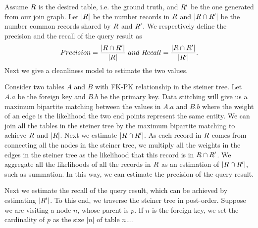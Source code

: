 

Assume $R$ is the desired table, i.e.  the ground truth, and $R'$ be the one
generated from our join graph. Let $|R|$ be the number records in $R$ and
$|R\cap R'|$ be the number common records shared by $R$ and $R'$. We
respectively define the precision and the recall of the query result as
$$Precision=\frac{|R\cap R'|}{|R|}~and~Recall=\frac{|R\cap R'|}{|R'|}.$$
Next we give a cleanliness model to estimate the two values.

Consider two tables $A$ and $B$ with FK-PK relationship in the steiner tree. Let
$A.a$ be the foreign key and $B.b$ be the primary key. Data stitching will give
us a maximum bipartite matching between the values in $A.a$ and $B.b$ where the
weight of an edge is the likelihood the two end points represent the same
entity. We can join all the tables in the steiner tree by the maximum bipartite
matching to achieve $R$ and $|R|$. Next we estimate $|R\cap R'|$. As each
record in $R$ comes from connecting all the nodes in the steiner tree, we
multiply all the weights in the edges in the steiner tree as the likelihood that
this record is in $R\cap R'$. We aggregate all the likelihoods of all the
records in $R$ as an estimation of $|R\cap R'|$, such as summation. In this
way, we can estimate the precision of the query result.


Next we estimate the recall of the query result, which can be achieved by
estimating $|R'|$. To this end, we traverse the steiner tree in post-order.
Suppose we are visiting a node $n$, whose parent is $p$. If $n$ is the foreign
key, we set the cardinality of $p$ as the size $|n|$ of table $n$....


